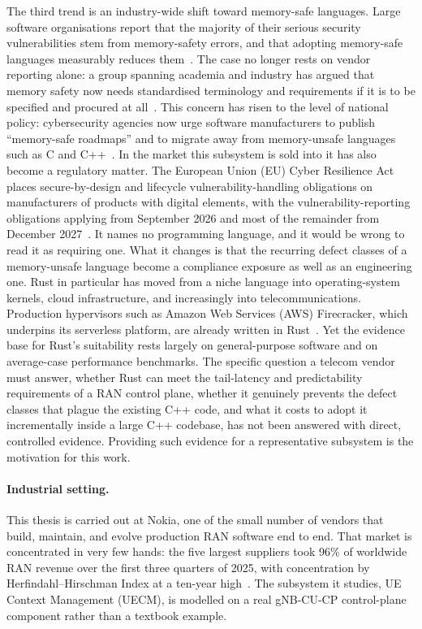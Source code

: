 \documentclass[english,twoside,openright,a4paper,censored,csm,software-track-2020]{HYthesisML}
\begin{document}
The third trend is an industry-wide shift toward memory-safe languages. Large
software organisations report that the majority of their serious security vulnerabilities
stem from memory-safety errors, and that adopting memory-safe languages measurably reduces
them~\cite{msrc2019memory,google2022android,vanderstoep2025android,google2024securebydesign}.
The case no longer rests on vendor reporting alone: a group spanning academia and industry has
argued that memory safety now needs standardised terminology and requirements if it is to be
specified and procured at all~\cite{watson2025memorysafety}. This concern has risen to the level of national
policy: cybersecurity agencies now urge software manufacturers to publish ``memory-safe
roadmaps'' and to migrate away from memory-unsafe languages such as C and
C++~\cite{cisa2023memorysafe,oncd2024building}. In the market this subsystem is sold into it has
also become a regulatory matter. The European Union (EU) Cyber Resilience Act places secure-by-design and
lifecycle vulnerability-handling obligations on manufacturers of products with digital elements,
with the vulnerability-reporting obligations applying from September 2026 and most of the
remainder from December 2027~\cite{eu2024cra}. It names no programming language, and it would be wrong to read it as
requiring one. What it changes is that the recurring defect classes of a memory-unsafe language
become a compliance exposure as well as an engineering one. Rust in particular has moved from a niche
language into operating-system kernels, cloud infrastructure, and increasingly into
telecommunications. Production hypervisors such as Amazon Web Services (AWS) Firecracker, which underpins its
serverless platform, are already written in Rust~\cite{agache2020firecracker}. Yet the evidence base for Rust's suitability rests largely on
general-purpose software and on average-case performance benchmarks. The specific question a
telecom vendor must answer, whether Rust can meet the tail-latency and predictability
requirements of a RAN control plane, whether it genuinely prevents the defect classes that
plague the existing C++ code, and what it costs to adopt it incrementally inside a large C++
codebase, has not been answered with direct, controlled evidence. Providing such evidence
for a representative subsystem is the motivation for this work.

\paragraph{Industrial setting.}
This thesis is carried out at Nokia, one of the small number of vendors that build, maintain,
and evolve production RAN software end to end. That market is concentrated in very few hands:
the five largest suppliers took 96\% of worldwide RAN revenue over the first three quarters of
2025, with concentration by Herfindahl--Hirschman Index at a ten-year
high~\cite{delloro2025ran3q,delloro2026ran}. The subsystem it studies, UE Context
Management (UECM), is modelled on a real gNB-CU-CP control-plane component rather than a
textbook example.
\end{document}
